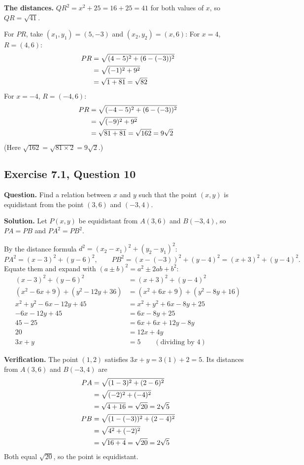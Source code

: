 \textbf{The distances.} $QR^2=x^2+25=16+25=41$ for both values of $x$, so $QR=\sqrt{41}$.

For $PR$, take $(x_1,y_1)=(5,-3)$ and $(x_2,y_2)=(x,6)$:
For $x=4$, $R=(4,6)$:
\begin{align*}
\distn{PR}{5}{-3}{4}{6}
\end{align*}
For $x=-4$, $R=(-4,6)$:
\begin{align*}
\dist{PR}{5}{-3}{-4}{6}{9\sqrt2}
\end{align*}
(Here $\sqrt{162}=\sqrt{81\times2}=9\sqrt2$.)


\subsection*{Exercise 7.1, Question 10}
\textbf{Question.} Find a relation between $x$ and $y$ such that the point $(x,y)$ is equidistant from the point $(3,6)$ and $(-3,4)$.

\textbf{Solution.} Let $P(x,y)$ be equidistant from $A(3,6)$ and $B(-3,4)$, so $PA=PB$ and $PA^2=PB^2$.

By the distance formula $d^2=(x_2-x_1)^2+(y_2-y_1)^2$:
\[
PA^2=(x-3)^2+(y-6)^2,\qquad PB^2=(x-(-3))^2+(y-4)^2=(x+3)^2+(y-4)^2 .
\]
Equate them and expand with $(a\pm b)^2=a^2\pm2ab+b^2$:
\begin{align*}
(x-3)^2+(y-6)^2&=(x+3)^2+(y-4)^2\\
(x^2-6x+9)+(y^2-12y+36)&=(x^2+6x+9)+(y^2-8y+16)\\
x^2+y^2-6x-12y+45&=x^2+y^2+6x-8y+25\\
-6x-12y+45&=6x-8y+25\\
45-25&=6x+6x+12y-8y\\
20&=12x+4y\\
3x+y&=5\qquad(\text{dividing by }4)
\end{align*}

\textbf{Verification.} The point $(1,2)$ satisfies $3x+y=3(1)+2=5$. Its distances from $A(3,6)$ and $B(-3,4)$ are
\begin{align*}
\dist{PA}{3}{6}{1}{2}{2\sqrt5}\\
\dist{PB}{-3}{4}{1}{2}{2\sqrt5}
\end{align*}
Both equal $\sqrt{20}$, so the point is equidistant.

